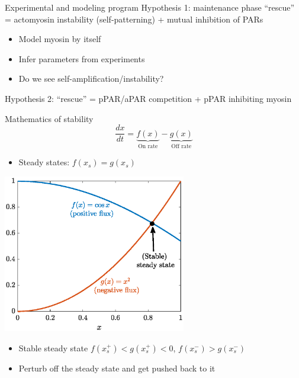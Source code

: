 \documentclass{beamer}
\newcommand{\6}[1]{#1_{\text{6}}}
\newcommand{\3}[1]{#1_{\text{3}}}
\begin{document}
\begin{frame}{Experimental and modeling program}
Hypothesis 1: maintenance phase ``rescue'' = actomyosin instability (self-patterning) + mutual inhibition of PARs
\begin{itemize}
\item Model myosin by itself
\item Infer parameters from experiments
\item Do we see self-amplification/instability?
\end{itemize}
Hypothesis 2: ``rescue'' = pPAR/aPAR competition + pPAR inhibiting myosin 
\end{frame}

\begin{frame}{Mathematics of stability}
$$\frac{dx}{dt}=\underbrace{f(x)}_\text{On rate}-\underbrace{g(x)}_\text{Off rate}$$
\begin{itemize}
\item Steady states: $f(x_s)=g(x_s)$
\end{itemize}
\begin{center}
\includegraphics[width=0.6\textwidth]{FluxExample.eps}
\end{center}
\vspace{-0.3 cm}
\begin{itemize}
\item Stable steady state $f(x_s^+) < g(x_s^+) < 0$,  $f(x_s^-)  > g(x_s^-)$
\item Perturb off the steady state and get pushed back to it
\end{itemize}
\end{frame}
\end{document}

